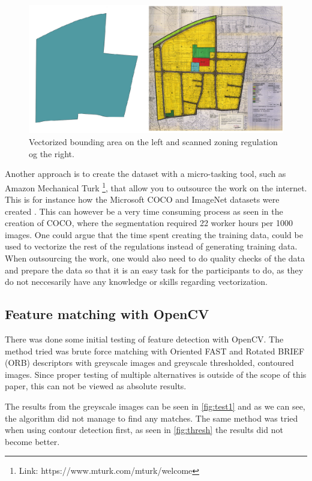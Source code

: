 \begin{figure}[H]
	\centering
	\includegraphics[width=\linewidth]{fig/georef-problem.png}
	\caption{Vectorized bounding area on the left and scanned zoning regulation og the right.}
	\label{fig:georeferencing}
\end{figure}

Another approach is to create the dataset with a micro-tasking tool, such as Amazon Mechanical Turk \footnote{Link: https://www.mturk.com/mturk/welcome}, that allow you to outsource the work on the internet. This is for instance how the Microsoft COCO and ImageNet datasets were created \cite{Lin2014}. This can however be a very time consuming process as seen in the creation of COCO, where the segmentation required 22 worker hours per 1000 images. One could argue that the time spent creating the training data, could be used to vectorize the rest of the regulations instead of generating training data. When outsourcing the work, one would also need to do quality checks of the data and prepare the data so that it is an easy task for the participants to do, as they do not neccesarily have any knowledge or skills regarding vectorization.

\subsection{Feature matching with OpenCV}
There was done some initial testing of feature detection with OpenCV. The method tried was brute force matching with Oriented FAST and Rotated BRIEF (ORB) descriptors with greyscale images and greyscale thresholded, contoured images. Since proper testing of multiple alternatives is outside of the scope of this paper, this can not be viewed as absolute results.

The results from the greyscale images can be seen in \autoref{fig:test1} and as we can see, the algorithm did not manage to find any matches. The same method was tried when using contour detection first, as seen in \autoref{fig:thresh} the results did not become better.


